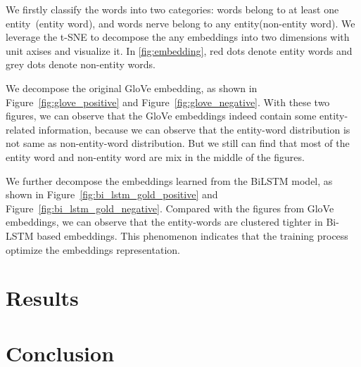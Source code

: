 \documentclass{article}
\begin{document}
We firstly classify the words into two categories: words belong to at least one entity~(entity word), and words nerve belong to any entity(non-entity word). We leverage the t-SNE to decompose the any embeddings into two dimensions with unit axises and visualize it. In \ref{fig:embedding}, red dots denote entity words and grey dots denote non-entity words. 

We decompose the original GloVe embedding, as shown in Figure~\ref{fig:glove_positive} and Figure~\ref{fig:glove_negative}. With these two figures, we can observe that the GloVe embeddings indeed contain some entity-related information, because we can observe that the entity-word distribution is not same as non-entity-word distribution. But we still can find that most of the entity word and non-entity word are mix in the middle of the figures. 

We further decompose the embeddings learned from the BiLSTM model, as shown in Figure~\ref{fig:bi_lstm_gold_positive} and Figure~\ref{fig:bi_lstm_gold_negative}. Compared with the figures from GloVe embeddings, we can observe that the entity-words are clustered tighter in Bi-LSTM based embeddings. This phenomenon indicates that the training process optimize the embeddings representation.


 
\section{Results}



\section{Conclusion}


\nocite{*}




\end{document}
